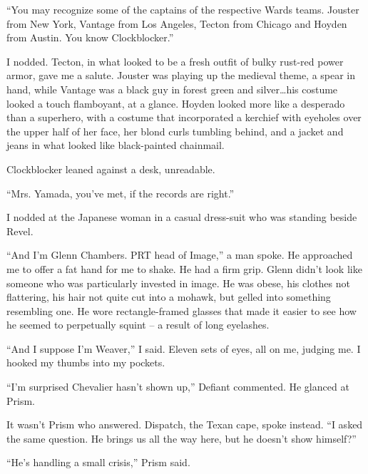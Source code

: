 ``You may recognize some of the captains of the respective Wards teams.  Jouster from New York, Vantage from Los Angeles, Tecton from Chicago and Hoyden from Austin.  You know Clockblocker.''



I nodded.  Tecton, in what looked to be a fresh outfit of bulky rust-red power armor, gave me a salute.  Jouster was playing up the medieval theme, a spear in hand, while Vantage was a black guy in forest green and silver\ldots his costume looked a touch flamboyant, at a glance.  Hoyden looked more like a desperado than a superhero, with a costume that incorporated a kerchief with eyeholes over the upper half of her face, her blond curls tumbling behind, and a jacket and jeans in what looked like black-painted chainmail.



Clockblocker leaned against a desk, unreadable.



``Mrs. Yamada, you've met, if the records are right.''



I nodded at the Japanese woman in a casual dress-suit who was standing beside Revel.



``And I'm Glenn Chambers.  PRT head of Image,'' a man spoke.  He approached me to offer a fat hand for me to shake.  He had a firm grip. Glenn didn't look like someone who was particularly invested in image.  He was obese, his clothes not flattering, his hair not quite cut into a mohawk, but gelled into something resembling one.  He wore rectangle-framed glasses that made it easier to see how he seemed to perpetually squint – a result of long eyelashes.



``And I suppose I'm Weaver,'' I said.  Eleven sets of eyes, all on me, judging me.  I hooked my thumbs into my pockets.



``I'm surprised Chevalier hasn't shown up,'' Defiant commented.  He glanced at Prism.



It wasn't Prism who answered.  Dispatch, the Texan cape, spoke instead.  ``I asked the same question.  He brings us all the way here, but he doesn't show himself?''



``He's handling a small crisis,'' Prism said.



